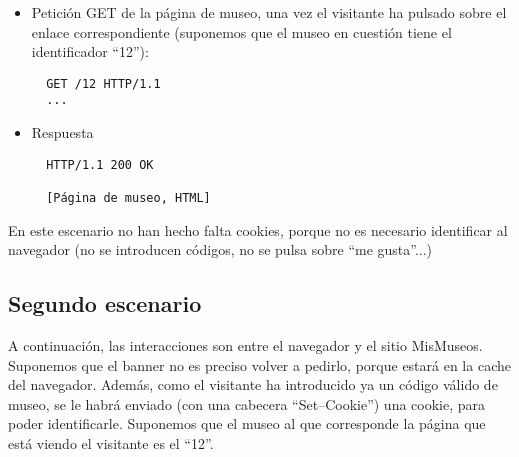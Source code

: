 \begin{itemize}
\item Petición GET de la página de museo, una vez el visitante ha pulsado sobre el enlace correspondiente (suponemos que el museo en cuestión tiene el identificador ``12''):

\begin{verbatim}
  GET /12 HTTP/1.1
  ...
\end{verbatim}

\item Respuesta

\begin{verbatim}
  HTTP/1.1 200 OK

  [Página de museo, HTML]
\end{verbatim}

\end{itemize}

En este escenario no han hecho falta cookies, porque no es necesario identificar al navegador (no se introducen códigos, no se pulsa sobre ``me gusta''...)


\subsection*{Segundo escenario}

A continuación, las interacciones son entre el navegador y el sitio MisMuseos. Suponemos que el banner no es preciso volver a pedirlo, porque estará en la cache del navegador. Además, como el visitante ha introducido ya un código válido de museo, se le habrá enviado (con una cabecera ``Set--Cookie'') una cookie, para poder identificarle. Suponemos que el museo al que corresponde la página que está viendo el visitante es el ``12''.

